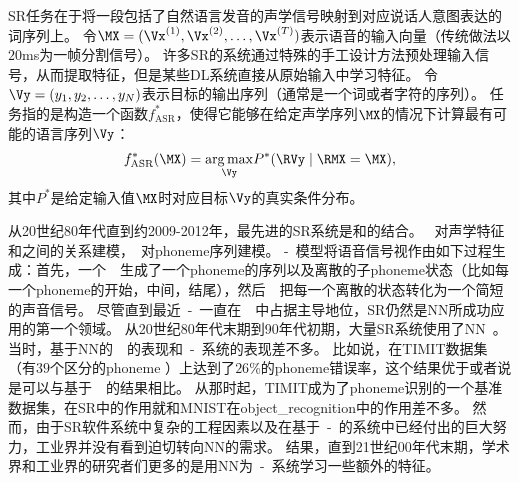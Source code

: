 \gls{SR}任务在于将一段包括了自然语言发音的声学信号映射到对应说话人意图表达的词序列上。
令$\MX=(\Vx^{(1)},\Vx^{(2)},\ldots,\Vx^{(T)})$表示语音的输入向量（传统做法以$20$ms为一帧分割信号）。
许多\gls{SR}的系统通过特殊的手工设计方法预处理输入信号，从而提取特征，但是某些\gls{DL}系统\citep{jaitly2011learning}直接从原始输入中学习特征。
令$\Vy=(y_{1},y_{2},\ldots,y_{N})$表示目标的输出序列（通常是一个词或者字符的序列）。
任务指的是构造一个函数$f^*_{\text{ASR}}$，使得它能够在给定声学序列$\MX$的情况下计算最有可能的语言序列$\Vy$：
\begin{align}
\label{eqn:124}
f^*_{\text{ASR}}(\MX) =  \underset{\Vy}{\arg\max}  P^*(\RVy \mid \RMX = \MX),
\end{align}
其中$P^*$是给定输入值$\MX$时对应目标$\Vy$的真实条件分布。

从20世纪80年代直到约2009-2012年，最先进的\gls{SR}系统是和的结合。
~对声学特征和之间的关系建模\citep{Bahl87}，~对\gls{phoneme}序列建模。
-~模型将语音信号视作由如下过程生成：首先，一个~~生成了一个\gls{phoneme}的序列以及离散的子\gls{phoneme}状态（比如每一个\gls{phoneme}的开始，中间，结尾），然后~~把每一个离散的状态转化为一个简短的声音信号。
尽管直到最近~-~一直在~~中占据主导地位，\gls{SR}仍然是\gls{NN}所成功应用的第一个领域。
从20世纪80年代末期到90年代初期，大量\gls{SR}系统使用了\gls{NN}~\citep{Bourlard-cspla89,Waibel89b,Robinson+Fallside91,Bengio91z,Bengio92c,Konig96}。
当时，基于\gls{NN}的~~的表现和~-~系统的表现差不多。
比如说，\citet{Robinson+Fallside91}在TIMIT数据集\citep{garofolo1993darpa}（有$39$个区分的\gls{phoneme}%
）上达到了$26$\%的\gls{phoneme}错误率，这个结果优于或者说是可以与基于~~的结果相比。
从那时起，TIMIT成为了\gls{phoneme}识别的一个基准数据集，在\gls{SR}中的作用就和MNIST在\gls{object_recognition}中的作用差不多。
然而，由于\gls{SR}软件系统中复杂的工程因素以及在基于~-~的系统中已经付出的巨大努力，工业界并没有看到迫切转向\gls{NN}的需求。
结果，直到21世纪00年代末期，学术界和工业界的研究者们更多的是用\gls{NN}为~-~系统学习一些额外的特征。


